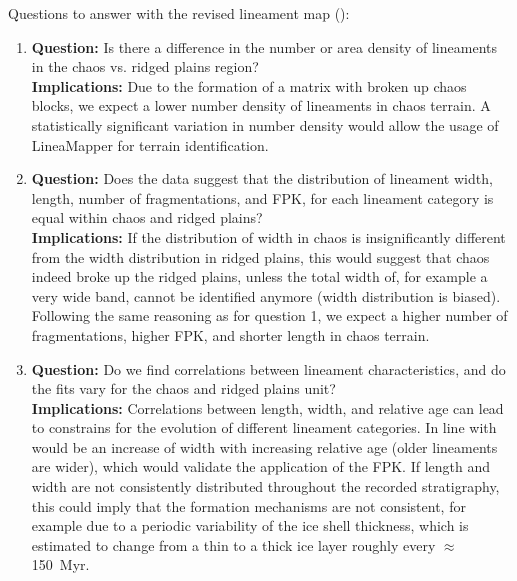 

Questions to answer with the revised lineament map ():
\begin{enumerate}
    \item \textbf{Question:} Is there a difference in the number or area density of lineaments in the chaos vs. ridged plains region?\\
     \textbf{Implications:} Due to the formation of a matrix with broken up chaos blocks, we expect a lower number density of lineaments in chaos terrain. A statistically significant variation in number density would allow the usage of LineaMapper for terrain identification.
    
    \item \textbf{Question:} Does the data suggest that the distribution of lineament width, length, number of fragmentations, and FPK, for each lineament category is equal within chaos and ridged plains?\\
    \textbf{Implications:} If the distribution of width in chaos is insignificantly different from the width distribution in ridged plains, this would suggest that chaos indeed broke up the ridged plains, unless the total width of, for example a very wide band, cannot be identified anymore (width distribution is biased). Following the same reasoning as for question 1, we expect a higher number of fragmentations, higher FPK, and shorter length in chaos terrain. 

    \item \textbf{Question:} Do we find correlations between lineament characteristics, and do the fits vary for the chaos and ridged plains unit?\\
    \textbf{Implications:} Correlations between length, width, and relative age can lead to constrains for the evolution of different lineament categories. In line with would be an increase of width with increasing relative age (older lineaments are wider), which would validate the application of the FPK. If length and width are not consistently distributed throughout the recorded stratigraphy, this could imply that the formation mechanisms are not consistent, for example due to a periodic variability of the ice shell thickness, which is estimated to change from a thin to a thick ice layer roughly every $\approx$150~Myr. 
\end{enumerate}

